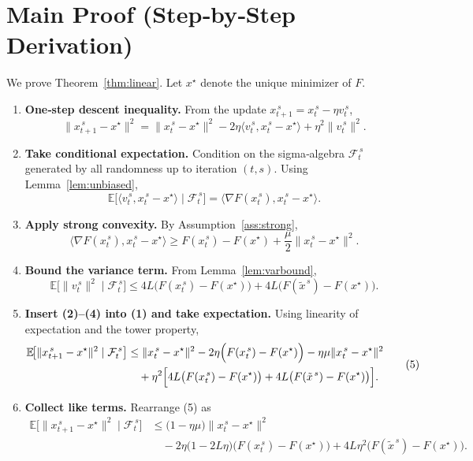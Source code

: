 \documentclass{article}
\begin{document}
\section*{Main Proof (Step‑by‑Step Derivation)}
We prove Theorem~\ref{thm:linear}. Let $x^\star$ denote the unique minimizer of $F$.

\begin{enumerate}[label=[Step \arabic*], leftmargin=*]
\item \textbf{One‑step descent inequality.}  
From the update $x_{t+1}^{\,s}=x_{t}^{\,s}-\eta v_t^{\,s}$,
\[
\|x_{t+1}^{\,s}-x^\star\|^{2}
= \|x_{t}^{\,s}-x^\star\|^{2}
-2\eta\langle v_t^{\,s},x_{t}^{\,s}-x^\star\rangle
+\eta^{2}\|v_t^{\,s}\|^{2}. \tag{1}
\]

\item \textbf{Take conditional expectation.}  
Condition on the sigma‑algebra $\mathcal{F}_{t}^{\,s}$ generated by all randomness up to iteration $(t,s)$. Using Lemma~\ref{lem:unbiased},
\[
\mathbb{E}\!\bigl[\langle v_t^{\,s},x_{t}^{\,s}-x^\star\rangle\mid\mathcal{F}_{t}^{\,s}\bigr]
= \langle\nabla F(x_{t}^{\,s}),x_{t}^{\,s}-x^\star\rangle . \tag{2}
\]

\item \textbf{Apply strong convexity.}  
By Assumption~\ref{ass:strong},
\[
\langle\nabla F(x_{t}^{\,s}),x_{t}^{\,s}-x^\star\rangle
\ge F(x_{t}^{\,s})-F(x^\star)+\frac{\mu}{2}\|x_{t}^{\,s}-x^\star\|^{2}. \tag{3}
\]

\item \textbf{Bound the variance term.}  
From Lemma~\ref{lem:varbound},
\[
\mathbb{E}\!\bigl[\|v_t^{\,s}\|^{2}\mid\mathcal{F}_{t}^{\,s}\bigr]
\le 4L\bigl(F(x_{t}^{\,s})-F(x^\star)\bigr)
   +4L\bigl(F(\tilde{x}^{\,s})-F(x^\star)\bigr). \tag{4}
\]

\item \textbf{Insert (2)–(4) into (1) and take expectation.}  
Using linearity of expectation and the tower property,
\[
\begin{aligned}
\mathbb{E}\!\bigl[\|x_{t+1}^{\,s}-x^\star\|^{2}\mid\mathcal{F}_{t}^{\,s}\bigr]
&\le \|x_{t}^{\,s}-x^\star\|^{2}
-2\eta\Bigl(F(x_{t}^{\,s})-F(x^\star)\Bigr)
-\eta\mu\|x_{t}^{\,s}-x^\star\|^{2} \\
&\quad +\eta^{2}\Bigl[4L\bigl(F(x_{t}^{\,s})-F(x^\star)\bigr)
+4L\bigl(F(\tilde{x}^{\,s})-F(x^\star)\bigr)\Bigr].
\end{aligned} \tag{5}
\]

\item \textbf{Collect like terms.}  
Rearrange (5) as
\[
\begin{aligned}
\mathbb{E}\!\bigl[\|x_{t+1}^{\,s}-x^\star\|^{2}\mid\mathcal{F}_{t}^{\,s}\bigr]
&\le \bigl(1-\eta\mu\bigr)\|x_{t}^{\,s}-x^\star\|^{2} \\
&\quad -2\eta\bigl(1-2L\eta\bigr)\bigl(F(x_{t}^{\,s})-F(x^\star)\bigr)
+4L\eta^{2}\bigl(F(\tilde{x}^{\,s})-F(x^\star)\bigr).
\end{aligned} \tag{6}
\]


\end{enumerate}
\end{document}
